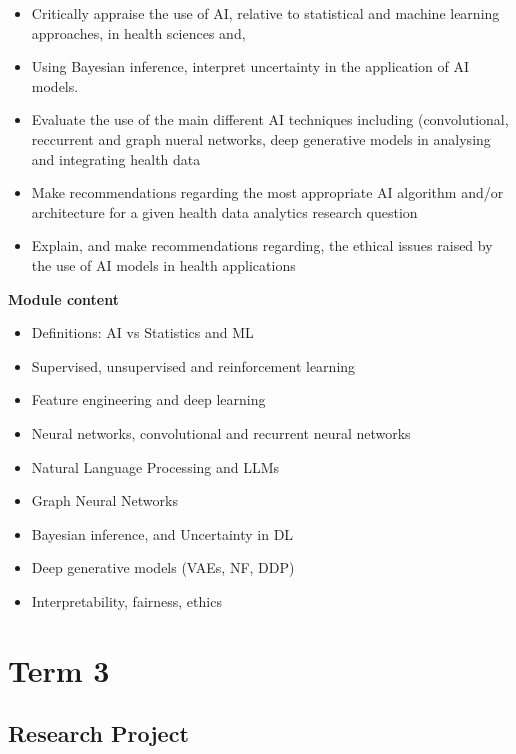 \documentclass[
]{book}
\providecommand{\tightlist}{%
  \setlength{\itemsep}{0pt}\setlength{\parskip}{0pt}}
\begin{document}
\begin{itemize}
\tightlist
\item
  Critically appraise the use of AI, relative to statistical and machine learning approaches, in health sciences and,
\item
  Using Bayesian inference, interpret uncertainty in the application of AI models.
\item
  Evaluate the use of the main different AI techniques including (convolutional, reccurrent and graph nueral
  networks, deep generative models in analysing and integrating health data
\item
  Make recommendations regarding the most appropriate AI algorithm and/or architecture for a given health data
  analytics research question
\item
  Explain, and make recommendations regarding, the ethical issues raised by the use of AI models in health applications
\end{itemize}

\textbf{Module content}

\begin{itemize}
\tightlist
\item
  Definitions: AI vs Statistics and ML
\item
  Supervised, unsupervised and reinforcement learning
\item
  Feature engineering and deep learning
\item
  Neural networks, convolutional and recurrent neural networks
\item
  Natural Language Processing and LLMs
\item
  Graph Neural Networks
\item
  Bayesian inference, and Uncertainty in DL
\item
  Deep generative models (VAEs, NF, DDP)
\item
  Interpretability, fairness, ethics
\end{itemize}

\section*{Term 3}\label{term-3}

\subsection*{Research Project}\label{research-project}
\end{document}
